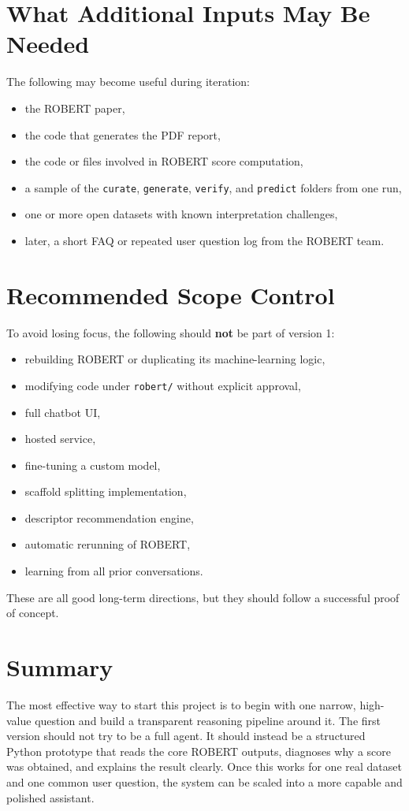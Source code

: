 \documentclass[11pt]{article}
\begin{document}
\section{What Additional Inputs May Be Needed}
The following may become useful during iteration:

\begin{itemize}
    \item the ROBERT paper,
    \item the code that generates the PDF report,
    \item the code or files involved in ROBERT score computation,
    \item a sample of the \texttt{curate}, \texttt{generate}, \texttt{verify}, and \texttt{predict} folders from one run,
    \item one or more open datasets with known interpretation challenges,
    \item later, a short FAQ or repeated user question log from the ROBERT team.
\end{itemize}

\section{Recommended Scope Control}
To avoid losing focus, the following should \textbf{not} be part of version 1:

\begin{itemize}
    \item rebuilding ROBERT or duplicating its machine-learning logic,
    \item modifying code under \texttt{robert/} without explicit approval,
    \item full chatbot UI,
    \item hosted service,
    \item fine-tuning a custom model,
    \item scaffold splitting implementation,
    \item descriptor recommendation engine,
    \item automatic rerunning of ROBERT,
    \item learning from all prior conversations.
\end{itemize}

These are all good long-term directions, but they should follow a successful proof of concept.

\section{Summary}
The most effective way to start this project is to begin with one narrow, high-value question and build a transparent reasoning pipeline around it. The first version should not try to be a full agent. It should instead be a structured Python prototype that reads the core ROBERT outputs, diagnoses why a score was obtained, and explains the result clearly. Once this works for one real dataset and one common user question, the system can be scaled into a more capable and polished assistant.
\end{document}
